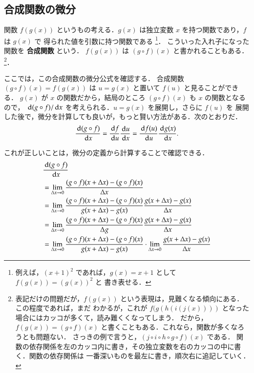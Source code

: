 \subsection{合成関数の微分}
    関数 $f(g(x))$ というもの考える．$g(x)$ は独立変数 $x$ を持つ関数であり，$f$ は $g(x)$ で
    得られた値を引数に持つ関数である
        \footnote{
            例えば，${(x+1)}^{2}$ であれば，$g(x)=x+1$ として $f(g(x))={\left(g(x)\right)}^{2}$ と
            書き表せる．
        }．
    こういった入れ子になった関数を \textbf{合成関数} という．
    $f(g(x))$ は $(g \circ f)(x)$ と書かれることもある．
        \footnote{
            表記だけの問題だが，$f(g(x))$ という表現は，見難くなる傾向にある．この程度であれば，まだ
            わかるが，これが $f(g(h(i(j(x))))$ となった場合にはカッコが多くて，読み難くくなってしまう．
            だから，$f(g(x))=(g \circ f)(x)$ と書くこともある．これなら，関数が多くなろうとも問題ない．
            さっきの例で言うと，$(j \circ i \circ h \circ g \circ f) (x)$ である．
            関数の依存関係を左のカッコ内に書き，その独立変数を右のカッコの中に書く．関数の依存関係は
            一番深いものを最左に書き，順次右に追記していく．
        }．

    ここでは，この合成関数の微分公式を確認する．
    合成関数 $(g \circ f)(x)=f(g(x))$ は $u=g(x)$ と置いて $f(u)$ と見ることができる．
    $g(x)$ が $x$ の関数だから，結局のところ $(g \circ f)(x)$ も $x$ の関数となるので，
    $\,\mathrm{d} (g \circ f) /\,\mathrm{d} x$ を考えられる．$u=g(x)$ を展開し，さらに $f(u)$ を
    展開した後で，微分を計算しても良いが，もっと賢い方法がある．次のとおりだ．
        \begin{align}
            \frac{\,\mathrm{d} (g \circ f)}{\,\mathrm{d} x}
            = \frac{\,\mathrm{d} f}{\,\mathrm{d} u}\frac{\,\mathrm{d} u}{\,\mathrm{d} x}
            = \frac{\,\mathrm{d} f(u)}{\,\mathrm{d} u}\frac{\,\mathrm{d} g(x)}{\,\mathrm{d} x}.
        \end{align}

    これが正しいことは，微分の定義から計算することで確認できる．
        \begin{align*}
            &\frac{\,\mathrm{d} (g \circ f)}{\,\mathrm{d} x} \\
            &= \lim_{\Delta x \to 0}
               \frac{(g \circ f)(x+\Delta x)-(g \circ f)(x)}{\Delta x} \\
            &= \lim_{\Delta x \to 0}
               \frac{(g \circ f)(x+\Delta x)-(g \circ f)(x)}{g(x + \Delta x) - g(x)}
               \frac{g(x + \Delta x) - g(x)}{\Delta x} \\
            &= \lim_{\Delta x \to 0}
               \frac{(g \circ f)(x+\Delta x)-(g \circ f)(x)}{\Delta g}
               \frac{g(x + \Delta x) - g(x)}{\Delta x} \\
            &= \lim_{\Delta x \to 0}
               \frac{(g \circ f)(x+\Delta x)-(g \circ f)(x)}{g(x + \Delta x) - g(x)}
               \cdot
               \lim_{\Delta x \to 0}
               \frac{g(x + \Delta x) - g(x)}{\Delta x}
        \end{align*}


